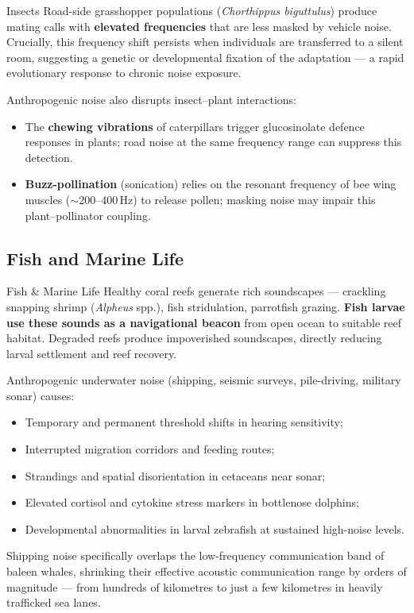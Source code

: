 \documentclass[12pt, a4paper]{article}
\begin{document}
\begin{speciesbox}{Insects}
Road-side grasshopper populations (\textit{Chorthippus biguttulus}) produce mating calls with
\textbf{elevated frequencies} that are less masked by vehicle noise. Crucially, this frequency
shift persists when individuals are transferred to a silent room, suggesting a genetic or
developmental fixation of the adaptation --- a rapid evolutionary response to chronic noise
exposure.

\medskip
Anthropogenic noise also disrupts insect--plant interactions:
\begin{itemize}[itemsep=2pt]
  \item The \textbf{chewing vibrations} of caterpillars trigger glucosinolate defence responses
        in plants; road noise at the same frequency range can suppress this detection.
  \item \textbf{Buzz-pollination} (sonication) relies on the resonant frequency of bee wing
        muscles ($\sim$200--400\,Hz) to release pollen; masking noise may impair this
        plant--pollinator coupling.
\end{itemize}
\end{speciesbox}

\subsection{Fish and Marine Life}

\begin{speciesbox}{Fish \& Marine Life}
Healthy coral reefs generate rich soundscapes --- crackling snapping shrimp
(\textit{Alpheus} spp.), fish stridulation, parrotfish grazing. \textbf{Fish larvae use these
sounds as a navigational beacon} from open ocean to suitable reef habitat. Degraded reefs
produce impoverished soundscapes, directly reducing larval settlement and reef recovery.

\medskip
Anthropogenic underwater noise (shipping, seismic surveys, pile-driving, military sonar) causes:
\begin{itemize}[itemsep=2pt]
  \item Temporary and permanent threshold shifts in hearing sensitivity;
  \item Interrupted migration corridors and feeding routes;
  \item Strandings and spatial disorientation in cetaceans near sonar;
  \item Elevated cortisol and cytokine stress markers in bottlenose dolphins;
  \item Developmental abnormalities in larval zebrafish at sustained high-noise levels.
\end{itemize}

\medskip
Shipping noise specifically overlaps the low-frequency communication band of baleen whales,
shrinking their effective acoustic communication range by orders of magnitude --- from hundreds
of kilometres to just a few kilometres in heavily trafficked sea lanes.
\end{speciesbox}
\end{document}
